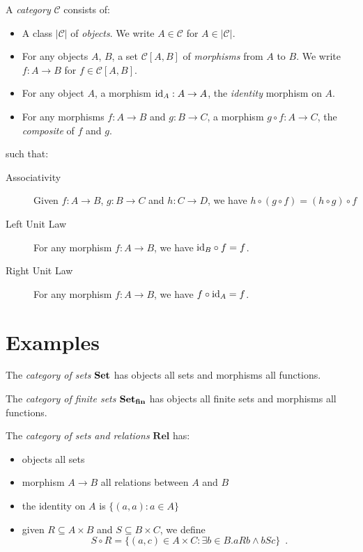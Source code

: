 \begin{df}[Category]
    A \emph{category} $\mathcal{C}$ consists of:
    \begin{itemize}
        \item A class $|\mathcal{C}|$ of \emph{objects}. We write $A \in \mathcal{C}$ for $A
                  \in |\mathcal{C}|$.
        \item For any objects $A$, $B$, a set $\mathcal{C}[A,B]$ of \emph{morphisms} from $A$
              to $B$. We write $f : A \rightarrow B$ for $f \in \mathcal{C}[A,B]$.
        \item For any object $A$, a morphism $\mathrm{id}_{A} : A \rightarrow A$, the \emph{identity}
              morphism on $A$.
        \item For any morphisms $f : A \rightarrow B$ and $g : B \rightarrow C$, a morphism
              $g \circ f : A \rightarrow C$, the \emph{composite} of $f$ and $g$.
    \end{itemize}
    such that:
    \begin{description}
        \item[Associativity] Given $f : A \rightarrow B$, $g : B \rightarrow C$ and $h : C
                \rightarrow D$, we have $h \circ (g \circ f) = (h \circ g) \circ f$
        \item[Left Unit Law] For any morphism $f : A \rightarrow B$, we have $\mathrm{id}_{B} \circ f
                = f$.
        \item[Right Unit Law] For any morphism $f : A \rightarrow B$, we have $f \circ \mathrm{id}_{A}
                = f$.
    \end{description}
\end{df}

\section{Examples}

\begin{ex}
    The \emph{category of sets} $\mathbf{Set}$ has objects all sets and morphisms all functions.
\end{ex}

\begin{ex}
The \emph{category of finite sets} $\mathbf{Set}_{\mathbf{fin}}$ has objects all finite sets and morphisms all functions.
\end{ex}

\begin{ex}
The \emph{category of sets and relations} $\mathbf{Rel}$ has:
\begin{itemize}
\item objects all sets
\item morphism $A \rightarrow B$ all relations between $A$ and $B$
\item the identity on $A$ is $\{ (a,a) : a \in A \}$
\item given $R \subseteq A \times B$ and $S \subseteq B \times C$, we define
\[ S \circ R = \{ (a,c) \in A \times C : \exists b \in B. aRb \wedge bSc \} \enspace . \]
\end{itemize}
\end{ex}

